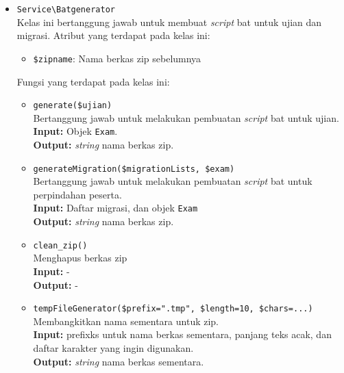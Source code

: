     \begin{itemize}
        \item \texttt{Service\textbackslash Batgenerator} \\
            Kelas ini bertanggung jawab untuk membuat \textit{script} bat untuk
            ujian dan migrasi. Atribut yang terdapat pada kelas ini:
            \begin{itemize}
                \item \texttt{\$zipname}: Nama berkas zip sebelumnya
            \end{itemize}
            Fungsi yang terdapat pada kelas ini:
            \begin{itemize}
                \item \texttt{generate(\$ujian)} \\
                    Bertanggung jawab untuk melakukan pembuatan \textit{script}
                    bat untuk ujian. \\
                    \textbf{Input:} Objek \texttt{Exam}.\\
                    \textbf{Output:} \textit{string} nama berkas zip.
                
                \item \texttt{generateMigration(\$migrationLists, \$exam)} \\
                    Bertanggung jawab untuk melakukan pembuatan \textit{script}
                    bat untuk perpindahan peserta.\\
                    \textbf{Input:} Daftar migrasi, dan objek \texttt{Exam}\\
                    \textbf{Output:} \textit{string} nama berkas zip.
                
                \item \texttt{clean\_zip()} \\
                    Menghapus berkas zip \\
                    \textbf{Input:} -\\
                    \textbf{Output:} -
                
                \item \texttt{tempFileGenerator(\$prefix=".tmp", \$length=10,
                \$chars=...)} \\
                    Membangkitkan nama sementara untuk zip. \\
                    \textbf{Input:} prefixks untuk nama berkas sementara,
                        panjang teks acak, dan daftar karakter yang ingin
                        digunakan.\\
                    \textbf{Output:} \textit{string} nama berkas sementara.
            \end{itemize}
        

\end{itemize}
